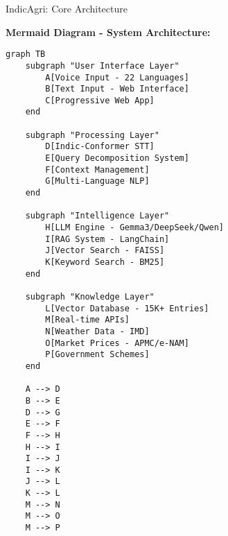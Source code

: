 \documentclass[aspectratio=169]{beamer}
\begin{document}
\begin{frame}{IndicAgri: Core Architecture}
\begin{center}
\textbf{Mermaid Diagram - System Architecture:}
\end{center}

\begin{footnotesize}
\begin{verbatim}
graph TB
    subgraph "User Interface Layer"
        A[Voice Input - 22 Languages] 
        B[Text Input - Web Interface]
        C[Progressive Web App]
    end
    
    subgraph "Processing Layer"
        D[Indic-Conformer STT]
        E[Query Decomposition System]
        F[Context Management]
        G[Multi-Language NLP]
    end
    
    subgraph "Intelligence Layer"
        H[LLM Engine - Gemma3/DeepSeek/Qwen]
        I[RAG System - LangChain]
        J[Vector Search - FAISS]
        K[Keyword Search - BM25]
    end
    
    subgraph "Knowledge Layer"
        L[Vector Database - 15K+ Entries]
        M[Real-time APIs]
        N[Weather Data - IMD]
        O[Market Prices - APMC/e-NAM]
        P[Government Schemes]
    end
    
    A --> D
    B --> E
    D --> G
    E --> F
    F --> H
    H --> I
    I --> J
    I --> K
    J --> L
    K --> L
    M --> N
    M --> O
    M --> P
\end{verbatim}
\end{footnotesize}
\end{frame}
\end{document}
